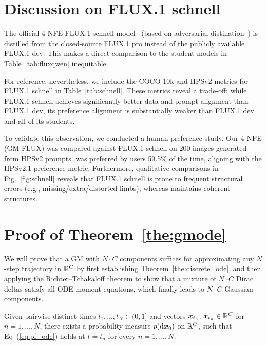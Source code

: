 \section{Discussion on FLUX.1 schnell}
\label{sec:schnell}

The official 4-NFE FLUX.1 schnell model~\citep{flux1_schnell_space_2024} (based on adversarial distillation~\citep{ladd}) is distilled from the closed-source FLUX.1 pro instead of the publicly available FLUX.1 dev. This makes a direct comparison to the student models in Table~\ref{tab:fluxqwen} inequitable.

For reference, nevertheless, we include the COCO-10k and HPSv2 metrics for FLUX.1 schnell in Table~\ref{tab:schnell}. These metrics reveal a trade-off: while FLUX.1 schnell achieves significantly better data and prompt alignment than FLUX.1 dev, its preference alignment is substantially weaker than FLUX.1 dev and all of its students.

To validate this observation, we conducted a human preference study. Our 4-NFE \methodname{} (GM-FLUX) was compared against FLUX.1 schnell on 200 images generated from HPSv2 prompts. \methodname{} was preferred by users 59.5\% of the time, aligning with the HPSv2.1 preference metric. Furthermore, qualitative comparisons in Fig.~\ref{fig:schnell} reveals that FLUX.1 schnell is prone to frequent structural errors (e.g., missing/extra/distorted limbs), whereas \methodname{} maintains coherent structures.

\section{Proof of Theorem~\ref{the:gmode}}
\label{sec:proof}

We will prove that a GM with $N\cdot C$ components suffices for approximating any $N$-step trajectory in $\mathbb{R}^C$ by first establishing Theorem~\ref{the:discrete_ode}, and then applying the Richter--Tchakaloff theorem to show that a mixture of $N\cdot C$ Dirac deltas satisfy all ODE moment equations, which finally leads to $N\cdot C$ Gaussian components.
\begin{theorem}
\label{the:discrete_ode}
Given pairwise distinct times $t_1,\ldots,t_N\in(0,1]$ and vectors 
${\bm{x}}_{t_n},\,\dot{{\bm{x}}}_{t_n}\in\mathbb{R}^C$ for $n=1,\ldots,N$, there exists a probability measure $p(\mathop{}\!\mathrm{d} {\bm{x}}_0)$ on $\mathbb{R}^C$, such that Eq~(\ref{eq:pf_ode}) holds at $t=t_n$ for every $n=1,\ldots,N$.
\end{theorem}

